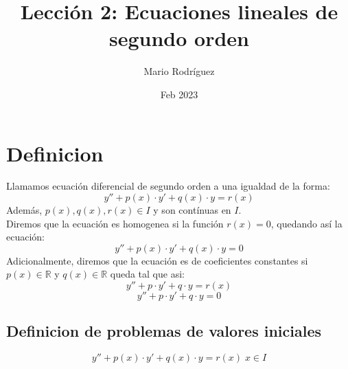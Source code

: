 \documentclass{article}
\title{Lección 2: Ecuaciones lineales de segundo orden}
\author{Mario Rodríguez}
\date{Feb 2023}
\begin{document}
\maketitle

\section{Definicion}
Llamamos ecuación diferencial de segundo orden a una igualdad de la forma:
\[y''+p(x)\cdot y'+q(x)\cdot y =r(x)\]
Además, $p(x), q(x) , r(x) \in I$ y son contínuas en $I$.\\
Diremos que la ecuación es homogenea si la función $r(x) = 0$, quedando así la ecuación:
\[y''+p(x)\cdot y'+q(x)\cdot y =0\]
Adicionalmente, diremos que la ecuación es de coeficientes constantes si $p(x)\in \mathbb{R}$ y $q(x)\in \mathbb{R}$ queda tal que asi:
\[y''+p\cdot y'+q\cdot y= r(x)\]
\[y''+p\cdot y'+q\cdot y= 0\]

\subsection[P.V.I]{Definicion de problemas de valores iniciales}

\[y'' +p(x)\cdot y' + q(x)\cdot y = r(x) \; x\in I\] 
\end{document}
